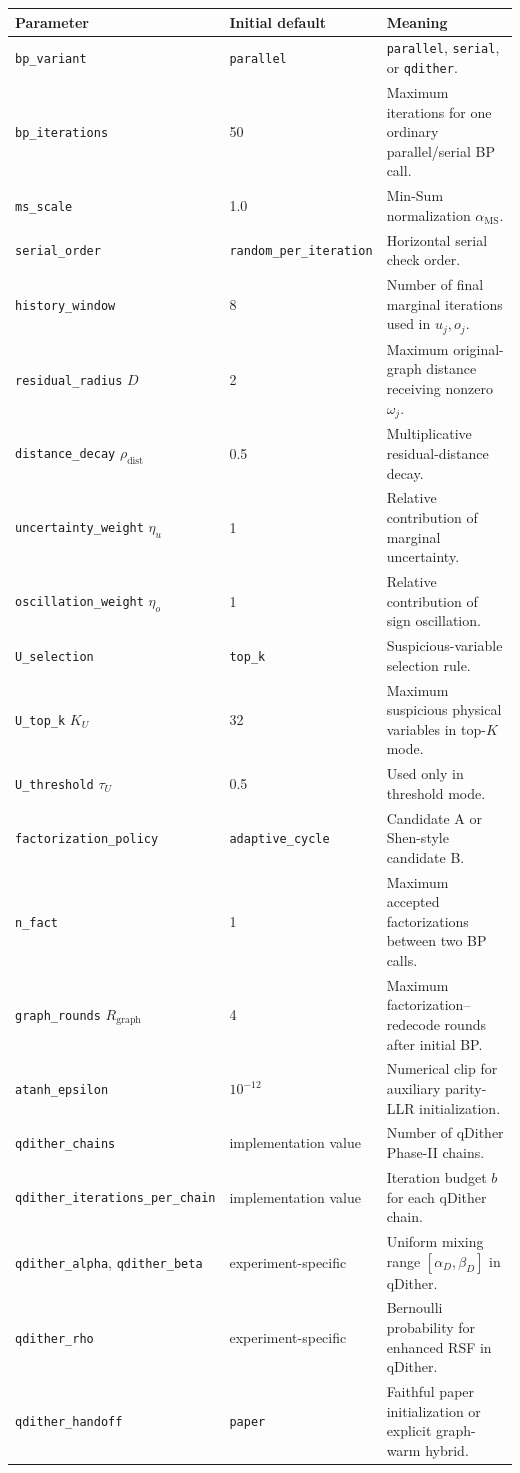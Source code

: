 \documentclass[11pt,a4paper]{article}
\begin{document}
\begin{longtable}{@{}p{46mm}p{31mm}p{84mm}@{}}
\toprule
Parameter & Initial default & Meaning \\
\midrule
\endhead
\texttt{bp\_variant}
& \texttt{parallel}
& \texttt{parallel}, \texttt{serial}, or \texttt{qdither}. \\
\texttt{bp\_iterations}
& 50
& Maximum iterations for one ordinary parallel/serial BP call. \\
\texttt{ms\_scale}
& 1.0
& Min-Sum normalization $\alpha_{\mathrm{MS}}$. \\
\texttt{serial\_order}
& \texttt{random\_per\_iteration}
& Horizontal serial check order. \\
\texttt{history\_window}
& 8
& Number of final marginal iterations used in $u_j,o_j$. \\
\texttt{residual\_radius} $D$
& 2
& Maximum original-graph distance receiving nonzero $\omega_j$. \\
\texttt{distance\_decay} $\rho_{\mathrm{dist}}$
& 0.5
& Multiplicative residual-distance decay. \\
\texttt{uncertainty\_weight} $\eta_u$
& 1
& Relative contribution of marginal uncertainty. \\
\texttt{oscillation\_weight} $\eta_o$
& 1
& Relative contribution of sign oscillation. \\
\texttt{U\_selection}
& \texttt{top\_k}
& Suspicious-variable selection rule. \\
\texttt{U\_top\_k} $K_U$
& 32
& Maximum suspicious physical variables in top-$K$ mode. \\
\texttt{U\_threshold} $\tau_U$
& 0.5
& Used only in threshold mode. \\
\texttt{factorization\_policy}
& \texttt{adaptive\_cycle}
& Candidate A or Shen-style candidate B. \\
\texttt{n\_fact}
& 1
& Maximum accepted factorizations between two BP calls. \\
\texttt{graph\_rounds} $R_{\mathrm{graph}}$
& 4
& Maximum factorization--redecode rounds after initial BP. \\
\texttt{atanh\_epsilon}
& $10^{-12}$
& Numerical clip for auxiliary parity-LLR initialization. \\
\texttt{qdither\_chains}
& implementation value
& Number of qDither Phase-II chains. \\
\texttt{qdither\_iterations\_per\_chain}
& implementation value
& Iteration budget $b$ for each qDither chain. \\
\texttt{qdither\_alpha}, \texttt{qdither\_beta}
& experiment-specific
& Uniform mixing range $[\alpha_D,\beta_D]$ in qDither. \\
\texttt{qdither\_rho}
& experiment-specific
& Bernoulli probability for enhanced RSF in qDither. \\
\texttt{qdither\_handoff}
& \texttt{paper}
& Faithful paper initialization or explicit graph-warm hybrid. \\
\bottomrule
\end{longtable}
\end{document}
